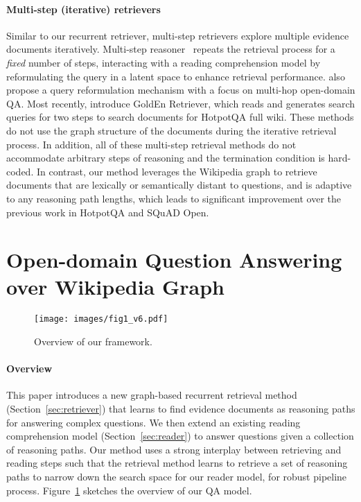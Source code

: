 \documentclass{article} \usepackage{iclr2020_conference,times}
\begin{document}
\vspace{-2mm}
\paragraph{Multi-step (iterative) retrievers}
Similar to our recurrent retriever, multi-step retrievers explore multiple evidence documents iteratively. 
Multi-step reasoner~\citep{das2019multi} repeats the retrieval process for a {\it fixed} number of steps, interacting with a reading comprehension model by reformulating the query in a latent space to enhance retrieval performance.
\cite{muppet2019multihop} also propose a query reformulation mechanism with a focus on multi-hop open-domain QA.
Most recently, \cite{qi2019answering} introduce GoldEn Retriever, which reads and generates search queries for two steps to search documents for HotpotQA full wiki. 
These methods do not use the graph structure of the documents during the iterative retrieval process.
In addition, all of these multi-step retrieval methods do not accommodate arbitrary steps of reasoning and the termination condition is hard-coded. In contrast, our method leverages the Wikipedia graph to retrieve documents that are lexically or semantically distant to questions, and is adaptive to any reasoning path lengths, which leads to significant improvement over the previous work in HotpotQA and SQuAD Open. 

\section{Open-domain Question Answering over Wikipedia Graph}
\begin{figure}[t!]
  \centering
  \texttt{[image: images/fig1\_v6.pdf]}
  \caption{Overview of our framework. }
  \label{figure:overview}
\end{figure}

\vspace{-2mm}
\paragraph{Overview}
This paper introduces a new graph-based recurrent retrieval method (Section~\ref{sec:retriever}) that learns to find evidence documents as reasoning paths for answering complex questions.
We then extend an existing reading comprehension model (Section~\ref{sec:reader}) to answer questions given a collection of reasoning paths. 
Our method uses a strong interplay between retrieving and reading steps such that the retrieval method learns to retrieve a set of reasoning paths to narrow down the search space for our reader model, for robust pipeline process.
Figure~\ref{figure:overview} sketches the overview of our QA model. 
\end{document}
